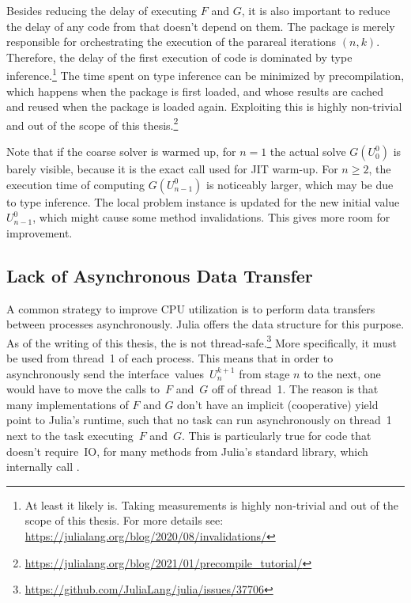 Besides reducing the delay of executing $F$ and $G$,
it is also important to reduce the delay of any code from  that doesn't depend on them.
The package is merely responsible for orchestrating the execution of the parareal iterations $(n,k)$.
Therefore, the delay of the first execution of  code is dominated by type inference.\footnote{%
  At least it likely is. Taking measurements is highly non-trivial and out of the scope of this thesis.
  For more details see: \url{https://julialang.org/blog/2020/08/invalidations/}
}
The time spent on type inference can be minimized by precompilation,
which happens when the package is first loaded,
and whose results are cached and reused when the package is loaded again.
Exploiting this is highly non-trivial and out of the scope of this thesis.\footnote{\url{https://julialang.org/blog/2021/01/precompile_tutorial/}}



Note that if the coarse solver is warmed up,
for $n=1$ the actual solve $G(U_0^0)$ is barely visible,
because it is the exact call used for \ac{JIT} warm-up.
For $n\geq 2$, the execution time of computing $G(U_{n-1}^0)$ is noticeably larger,
which may be due to type inference.
The local problem instance is updated for the new initial value $U_{n-1}^0$,
which might cause some method invalidations.
This gives more room for improvement.

\subsection{Lack of Asynchronous Data Transfer}

A common strategy to improve CPU utilization is to perform data transfers between processes asynchronously.
Julia offers the  data structure for this purpose.
As of the writing of this thesis,
the  is not thread-safe.\footnote{\url{https://github.com/JuliaLang/julia/issues/37706}}
More specifically, it must be used from thread~1 of each process.
This means that in order to asynchronously send the interface~values~$U_n^{k+1}$ from stage $n$ to the next,
one would have to move the calls to~$F$ and~$G$ off of thread~1.
The reason is that many implementations of $F$ and $G$ don't have an implicit (cooperative) yield point to Julia's runtime,
such that no task can run asynchronously on thread~1 next to the task executing~$F$ and~$G$.
This is particularly true for code that doesn't require~\ac{IO},
\eg for many methods from Julia's  standard library,
which internally call .

